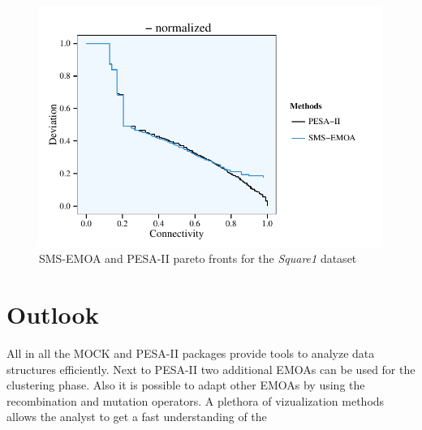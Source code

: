 \documentclass[parskip=half,DIV=14]{scrartcl}\usepackage[]{graphicx}\usepackage[]{color}
\makeatletter
\def\maxwidth{ %
  \ifdim\Gin@nat@width>\linewidth
    \linewidth
  \else
    \Gin@nat@width
  \fi
}
\newenvironment{knitrout}{}{} %
\makeatother
\begin{document}
\begin{figure}
\begin{center}
\begin{knitrout}
\color{fgcolor}

{\centering \includegraphics[width=\maxwidth]{figures/plots-printMultiple-1} 

}



\end{knitrout}
\caption{SMS-EMOA and PESA-II pareto fronts for the \textit{Square1} dataset}
\label{fig:multiple}
\end{center}
\end{figure}


\section{Outlook}
All in all the MOCK and PESA-II packages provide tools to analyze data structures efficiently. Next to PESA-II two additional EMOAs can be used for the clustering phase. Also it is possible to adapt other EMOAs by using the  recombination and mutation operators. A plethora of vizualization methods allows the analyst to get a fast understanding of the 
\end{document}
